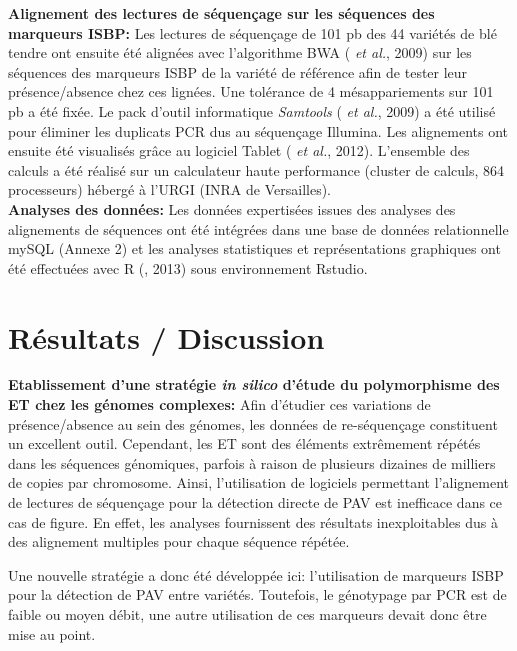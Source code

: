 \documentclass[a4paper, 12pt]{article}
\begin{document}
\begin{onehalfspace}
\textbf{Alignement des lectures de séquençage sur les séquences des marqueurs ISBP:} Les lectures de séquençage de 101 pb des 44 variétés de blé tendre ont ensuite été alignées avec l'algorithme BWA ( \textit{et al.}, 2009) sur les séquences des marqueurs ISBP de la variété de référence afin de tester leur présence/absence chez ces lignées. Une tolérance de 4 mésappariements sur 101 pb a été fixée. Le pack d'outil informatique \textit{Samtools} ( \textit{et al.}, 2009) a été utilisé pour éliminer les duplicats PCR dus au séquençage Illumina. Les alignements ont ensuite été visualisés grâce au logiciel Tablet ( \textit{et al.}, 2012). L'ensemble des calculs a été réalisé sur un calculateur haute performance (cluster de calculs, 864 processeurs) hébergé à l'URGI (INRA de Versailles).\\

\textbf{Analyses des données:} Les données expertisées issues des analyses des alignements de séquences ont été intégrées dans une base de données relationnelle mySQL (Annexe 2) et les analyses statistiques et représentations graphiques ont été effectuées avec R (, 2013) sous environnement Rstudio.\\


\part{Résultats / Discussion}
\textbf{Etablissement d'une stratégie \textit{in silico} d'étude du polymorphisme des ET chez les génomes complexes:} Afin d'étudier ces variations de présence/absence au sein des génomes, les données de re-séquençage constituent un excellent outil. Cependant, les ET sont des éléments extrêmement répétés dans les séquences génomiques, parfois à raison de plusieurs dizaines de milliers de copies par chromosome. Ainsi, l'utilisation de logiciels permettant l'alignement de lectures de séquençage pour la détection directe de PAV est inefficace dans ce cas de figure. En effet, les analyses fournissent des résultats inexploitables dus à des alignement multiples pour chaque séquence répétée.

Une nouvelle stratégie a donc été développée ici: l'utilisation de marqueurs ISBP pour la détection de PAV entre variétés. Toutefois, le génotypage par PCR est de faible ou moyen débit, une autre utilisation de ces marqueurs devait donc être mise au point.


\end{onehalfspace}
\end{document}
